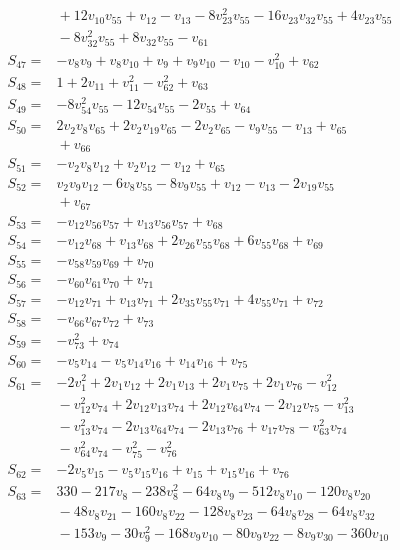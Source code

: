 \begin{align*}
&{}+12v_{10}v_{55}+v_{12}-v_{13}-8v_{23}^{2}v_{55}-16v_{23}v_{32}v_{55}+4v_{23}v_{55}\\
&{}-8v_{32}^{2}v_{55}+8v_{32}v_{55}-v_{61}\\
S_{47}={}&-v_{8}v_{9}+v_{8}v_{10}+v_{9}+v_{9}v_{10}-v_{10}-v_{10}^{2}+v_{62}\\
S_{48}={}&1+2v_{11}+v_{11}^{2}-v_{62}^{2}+v_{63}\\
S_{49}={}&-8v_{54}^{2}v_{55}-12v_{54}v_{55}-2v_{55}+v_{64}\\
S_{50}={}&2v_{2}v_{8}v_{65}+2v_{2}v_{19}v_{65}-2v_{2}v_{65}-v_{9}v_{55}-v_{13}+v_{65}\\
&{}+v_{66}\\
S_{51}={}&-v_{2}v_{8}v_{12}+v_{2}v_{12}-v_{12}+v_{65}\\
S_{52}={}&v_{2}v_{9}v_{12}-6v_{8}v_{55}-8v_{9}v_{55}+v_{12}-v_{13}-2v_{19}v_{55}\\
&{}+v_{67}\\
S_{53}={}&-v_{12}v_{56}v_{57}+v_{13}v_{56}v_{57}+v_{68}\\
S_{54}={}&-v_{12}v_{68}+v_{13}v_{68}+2v_{26}v_{55}v_{68}+6v_{55}v_{68}+v_{69}\\
S_{55}={}&-v_{58}v_{59}v_{69}+v_{70}\\
S_{56}={}&-v_{60}v_{61}v_{70}+v_{71}\\
S_{57}={}&-v_{12}v_{71}+v_{13}v_{71}+2v_{35}v_{55}v_{71}+4v_{55}v_{71}+v_{72}\\
S_{58}={}&-v_{66}v_{67}v_{72}+v_{73}\\
S_{59}={}&-v_{73}^{2}+v_{74}\\
S_{60}={}&-v_{5}v_{14}-v_{5}v_{14}v_{16}+v_{14}v_{16}+v_{75}\\
S_{61}={}&-2v_{1}^{2}+2v_{1}v_{12}+2v_{1}v_{13}+2v_{1}v_{75}+2v_{1}v_{76}-v_{12}^{2}\\
&{}-v_{12}^{2}v_{74}+2v_{12}v_{13}v_{74}+2v_{12}v_{64}v_{74}-2v_{12}v_{75}-v_{13}^{2}\\
&{}-v_{13}^{2}v_{74}-2v_{13}v_{64}v_{74}-2v_{13}v_{76}+v_{17}v_{78}-v_{63}^{2}v_{74}\\
&{}-v_{64}^{2}v_{74}-v_{75}^{2}-v_{76}^{2}\\
S_{62}={}&-2v_{5}v_{15}-v_{5}v_{15}v_{16}+v_{15}+v_{15}v_{16}+v_{76}\\
S_{63}={}&330-217v_{8}-238v_{8}^{2}-64v_{8}v_{9}-512v_{8}v_{10}-120v_{8}v_{20}\\
&{}-48v_{8}v_{21}-160v_{8}v_{22}-128v_{8}v_{23}-64v_{8}v_{28}-64v_{8}v_{32}\\
&{}-153v_{9}-30v_{9}^{2}-168v_{9}v_{10}-80v_{9}v_{22}-8v_{9}v_{30}-360v_{10}\\

\end{align*}
